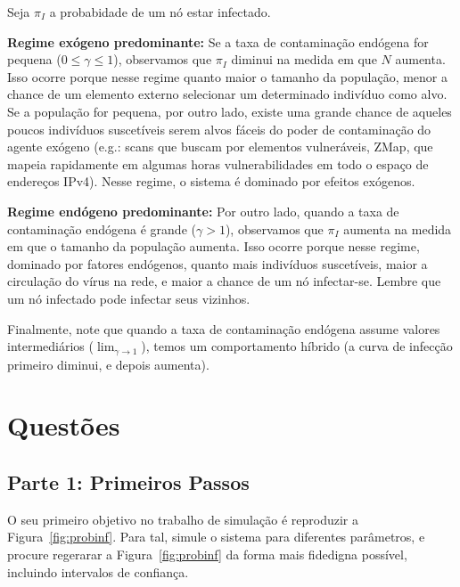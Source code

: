 \documentclass[a4paper]{article}
\begin{document}



Seja $\pi_I$ a probabidade de um nó estar infectado.  

\textbf{Regime exógeno predominante:} Se a taxa de contaminação endógena for pequena ($0 \leq \gamma \leq 1 $), observamos que $\pi_I$ diminui na medida em que $N$ aumenta.   Isso ocorre porque nesse regime quanto maior o tamanho da população,  menor a chance de um elemento externo selecionar um determinado indivíduo como alvo. Se a população for pequena, por outro lado, existe uma grande chance de aqueles poucos indivíduos suscetíveis serem alvos fáceis do poder de contaminação do agente exógeno (e.g.: scans que buscam por elementos vulneráveis,  ZMap, que mapeia rapidamente em algumas horas vulnerabilidades em todo o espaço de endereços IPv4).  Nesse regime, o sistema é dominado por efeitos exógenos. 



\textbf{Regime endógeno predominante:} Por outro lado, quando a taxa de contaminação endógena é grande ($\gamma > 1$), observamos que $\pi_I$ aumenta na medida em que o tamanho da população aumenta.   Isso ocorre porque nesse regime, dominado por fatores endógenos, quanto mais indivíduos suscetíveis, maior a circulação do vírus na rede, e maior a chance de um nó infectar-se. Lembre que um nó infectado pode infectar seus vizinhos.


Finalmente, note que quando a taxa de contaminação endógena assume valores intermediários ($\lim_{\gamma \to 1}$), temos um comportamento híbrido (a curva de infecção primeiro diminui, e depois aumenta).

\section{Questões}

\subsection{Parte 1: Primeiros Passos}

O seu primeiro objetivo no trabalho de simulação é reproduzir a Figura~\ref{fig:probinf}.  Para tal, simule o sistema para diferentes parâmetros, e procure regerarar a Figura~\ref{fig:probinf} da forma mais fidedigna possível, incluindo intervalos de confiança.
\end{document}
